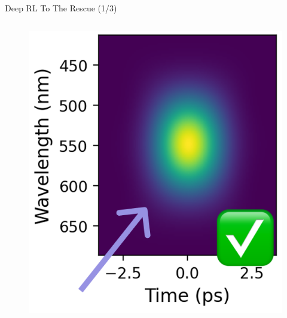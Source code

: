 \documentclass{beamer}
\begin{document}
\begin{frame}{Deep RL To The Rescue (1/3)}
\begin{columns}[T,totalwidth=\textwidth]
\begin{column}{0.3\textwidth}
\begin{figure}
        \end{figure}
        \begin{figure}
            \includegraphics[width=0.6\linewidth]{images/rl-sol-1.png}
        \end{figure}
    \end{column}
\end{columns}
\end{frame}
\end{document}
